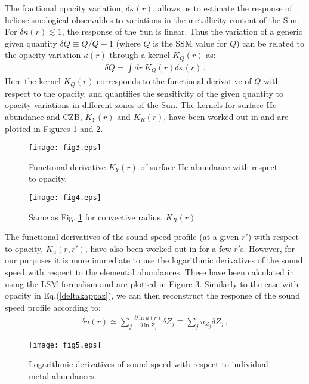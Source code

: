 \documentclass[aps,prl,twocolumn,showpacs]{revtex4}
\begin{document}
The fractional opacity variation, $\delta \kappa (r)$, allows us to estimate the response of helioseismological observables to variations in the metallicity content of the Sun. For $\delta \kappa (r) \lesssim 1$, the response of the Sun is linear. Thus the variation of a generic given quantity $\delta Q \equiv Q/\overline{Q}-1$ (where $\overline{Q}$ is the SSM value for $Q$) can be related to the opacity variation $\kappa (r)$ through a kernel $K_Q(r)$ as:
%
\begin{eqnarray}
\delta Q = \int dr \ K_Q(r)\delta \kappa (r) \, .
\label{kernel}
\end{eqnarray}
%
Here the kernel $K_Q(r)$ corresponds to the functional derivative of $Q$ with respect to the opacity, and quantifies the sensitivity of the given quantity to opacity variations in different zones of the Sun. \newline \indent
The kernels for surface He abundance and CZB, $K_Y(r)$ and $K_R(r)$, have been worked out in \cite{villante4} and are plotted in Figures \ref{fig3} and \ref{fig4}.%
\begin{figure}[!h]
\texttt{[image: fig3.eps]}
\caption{Functional derivative $K_Y(r)$ of surface He abundance with respect to opacity.}
\label{fig3}
\end{figure}
\begin{figure}[!h]
\texttt{[image: fig4.eps]}
\caption{Same as Fig. \ref{fig3} for convective radius, $K_R(r)$.}
\label{fig4}
\end{figure}
The functional derivatives of the sound speed profile (at a given $r'$) with respect to opacity, $K_u(r,r')$, have also been worked out in \cite{villante4} for a few $r'$s. However, for our purposes it is more immediate to use the logarithmic derivatives of the sound speed with respect to the elemental abundances. These have been calculated in \cite{villante3} using the LSM formalism and are plotted in Figure \ref{fig5}. Similarly to the case with opacity in Eq.(\ref{deltakappaz}), we can then reconstruct the response of the sound speed profile according to:
%
\begin{eqnarray}
\delta u (r) \simeq \sum _j \frac{\partial \ln u(r)}{\partial \ln Z_j}\delta Z_j \equiv \sum _j u_{Z_j}\delta Z_j \, ,
\label{deltaur}
\end{eqnarray}
%
\begin{figure}[!h]
\texttt{[image: fig5.eps]}
\caption{Logarithmic derivatives of sound speed with respect to individual metal abundances.}
\label{fig5}
\end{figure}
\end{document}
